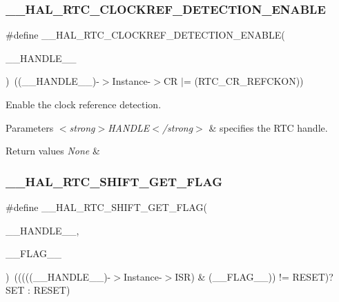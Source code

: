 \subsubsection{\texorpdfstring{\+\_\+\+\_\+\+H\+A\+L\+\_\+\+R\+T\+C\+\_\+\+C\+L\+O\+C\+K\+R\+E\+F\+\_\+\+D\+E\+T\+E\+C\+T\+I\+O\+N\+\_\+\+E\+N\+A\+B\+LE}{\_\_HAL\_RTC\_CLOCKREF\_DETECTION\_ENABLE}}
{\footnotesize\ttfamily \#define \+\_\+\+\_\+\+H\+A\+L\+\_\+\+R\+T\+C\+\_\+\+C\+L\+O\+C\+K\+R\+E\+F\+\_\+\+D\+E\+T\+E\+C\+T\+I\+O\+N\+\_\+\+E\+N\+A\+B\+LE(\begin{DoxyParamCaption}\item[{}]{\+\_\+\+\_\+\+H\+A\+N\+D\+L\+E\+\_\+\+\_\+ }\end{DoxyParamCaption})~((\+\_\+\+\_\+\+H\+A\+N\+D\+L\+E\+\_\+\+\_\+)-\/$>$Instance-\/$>$CR $\vert$= (R\+T\+C\+\_\+\+C\+R\+\_\+\+R\+E\+F\+C\+K\+ON))}



Enable the clock reference detection. 


\begin{DoxyParams}{Parameters}
{\em $<$strong$>$\+H\+A\+N\+D\+L\+E$<$/strong$>$} & specifies the R\+TC handle. \\
\hline
\end{DoxyParams}

\begin{DoxyRetVals}{Return values}
{\em None} & \\
\hline
\end{DoxyRetVals}
\mbox{\label{group___r_t_c_ex___calibration_ga5e1482310c213248d8416b24a5e6b3f3}} 
\subsubsection{\texorpdfstring{\+\_\+\+\_\+\+H\+A\+L\+\_\+\+R\+T\+C\+\_\+\+S\+H\+I\+F\+T\+\_\+\+G\+E\+T\+\_\+\+F\+L\+AG}{\_\_HAL\_RTC\_SHIFT\_GET\_FLAG}}
{\footnotesize\ttfamily \#define \+\_\+\+\_\+\+H\+A\+L\+\_\+\+R\+T\+C\+\_\+\+S\+H\+I\+F\+T\+\_\+\+G\+E\+T\+\_\+\+F\+L\+AG(\begin{DoxyParamCaption}\item[{}]{\+\_\+\+\_\+\+H\+A\+N\+D\+L\+E\+\_\+\+\_\+,  }\item[{}]{\+\_\+\+\_\+\+F\+L\+A\+G\+\_\+\+\_\+ }\end{DoxyParamCaption})~(((((\+\_\+\+\_\+\+H\+A\+N\+D\+L\+E\+\_\+\+\_\+)-\/$>$Instance-\/$>$I\+SR) \& (\+\_\+\+\_\+\+F\+L\+A\+G\+\_\+\+\_\+)) != R\+E\+S\+ET)? S\+ET \+: R\+E\+S\+ET)}



